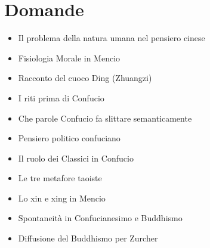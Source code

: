 \documentclass[10pt,a4paper]{report}
\begin{document}
\section{Domande}
\begin{itemize}
	\item Il problema della natura umana nel pensiero cinese
	\item Fisiologia Morale in Mencio
	\item Racconto del cuoco Ding (Zhuangzi)
	\item I riti prima di Confucio
	\item Che parole Confucio fa slittare semanticamente
	\item Pensiero politico confuciano
	\item Il ruolo dei Classici in Confucio
	\item Le tre metafore taoiste
	\item Lo xin e xing in Mencio
	\item Spontaneità in Confucianesimo e Buddhismo
	\item Diffusione del Buddhismo per Zurcher
\end{itemize}
\end{document}
